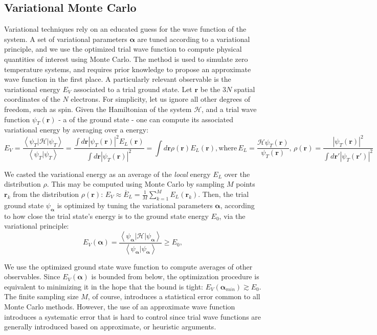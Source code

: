 \subsection{Variational Monte Carlo}

Variational techniques rely on an educated guess for the wave function of the system.
A set of variational parameters $\bm \alpha$ are tuned according to a variational principle, and we use the optimized trial wave function to compute physical quantities of interest using Monte Carlo.
The method is used to simulate zero temperature systems, and requires prior knowledge to propose an approximate wave function in the first place.
A particularly relevant observable is the variational energy $E_V$ associated to a trial ground state.
Let $\bm r$ be the $3N$ spatial coordinates of the $N$ electrons.
For simplicity, let us ignore all other degrees of freedom, such as spin.
Given the Hamiltonian of the system $\mathcal{H}$, and a trial wave function $\psi_T (\bm r)$ - a  of the ground state - one can compute its associated variational energy by averaging over a  energy:
\begin{equation}\label{eq:variational_energy}
E_V = \frac{\left\langle \psi_T | \mathcal{H} | \psi_T \right \rangle}{\left\langle \psi_T | \psi_T \right \rangle} = \frac{ \int d\bm r |\psi_T (\bm r)|^2 E_L (\bm r)}{\int d\bm r | \psi_T (\bm r)|^2 } = \int d\bm r\rho (\bm r) E_L (\bm r) , \text{where} \, 
E_L = \frac{\mathcal{H} \psi_T (\bm r) }{\psi_T (\bm r)} , \, \rho (\bm r) = \frac{ | \psi_T (\bm r) |^2}{ \int d\bm r' | \psi_T (\bm r') |^2}
\end{equation}

We casted the variational energy as an average of the \emph{local} energy $E_L$ over the distribution $\rho$.
This may be computed using Monte Carlo by sampling $M$ points $\bm r_k$ from the distribution $\rho (\bm r)$:
$
E_V \approx \overline{E}_L = \frac{1}{M} \sum_{k= 1}^{M} E_L (\bm r_k)
$.
Then, the trial ground state $\psi_{\bm \alpha}$ is optimized by tuning the  variational parameters ${\bm \alpha}$, according to how close the trial state's energy is to the ground state energy $E_0$, via the variational principle:
\begin{equation}
E_V(\bm \alpha) = \frac{\left\langle \psi_{\bm \alpha} | \mathcal{H} | \psi_{\bm \alpha} \right\rangle}{\left\langle\psi_{\bm \alpha} | \psi_{\bm \alpha} \right\rangle} \ge E_0,
\end{equation}

We use the optimized ground state wave  function to compute averages of other observables.
Since $E_V(\bm \alpha)$ is bounded from below, the optimization procedure is equivalent to minimizing it in the hope that the bound is tight: $E_V(\bm \alpha_{min}) \gtrsim E_0$.
The finite sampling size $M$, of course, introduces a statistical error common to all Monte Carlo methods. 
However, the use of an approximate wave function introduces a systematic error that is hard to control since trial wave functions are generally introduced based on approximate, or heuristic arguments.


